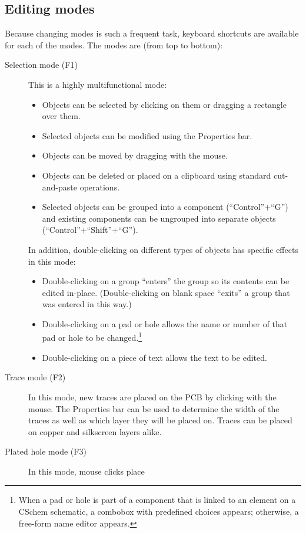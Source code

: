 \documentclass[11pt]{report}
\begin{document}
\subsection{Editing modes}
Because changing modes is such a frequent task,
keyboard shortcuts are available for each of the modes. The modes are
(from top to bottom):
\begin{description}
\item[Selection mode (F1)]This is a highly multifunctional mode:
  \begin{itemize}
  \item Objects can be selected by
    clicking on them or dragging a rectangle over them.
  \item Selected objects can be modified using the Properties bar.
  \item Objects can be moved by dragging with the mouse.
  \item Objects can be deleted or placed on a clipboard using
    standard cut-and-paste operations.
  \item Selected objects can be grouped into a component
    (``Control''+``G'') and existing components can be ungrouped
    into separate objects (``Control''+``Shift''+``G'').
  \end{itemize}
  In addition, double-clicking on different types of objects has
  specific effects in this mode:
  \begin{itemize}
    \item Double-clicking on a group ``enters'' the group so its
      contents can be edited in-place. (Double-clicking on blank space
      ``exits'' a group that was entered in this way.)
    \item Double-clicking on a pad or hole allows the name or number
      of that pad or hole to be changed.\footnote{When a pad or hole
        is part of a component that is linked to an element on a
        CSchem schematic, a combobox with predefined choices appears;
        otherwise, a free-form name editor appears.}
      \item Double-clicking on a piece of text allows the text to be
        edited.
  \end{itemize}
  \item[Trace mode (F2)] In this mode, new traces are placed on the
    PCB by clicking with the mouse. The Properties bar can be used to determine the width of the
    traces as well as which layer they will be placed on. Traces can
    be placed on copper and silkscreen layers alike.
    \item[Plated hole mode (F3)] In this mode, mouse clicks place

\end{description}
\end{document}
